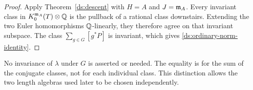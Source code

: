 \begin{proof}
Apply Theorem~\ref{ds:descent} with $H=A$ and $J=\mathfrak{m}_A$.
Every invariant class in $K_0^{\mathfrak{m}_A}(T)\otimes\mathbb{Q}$ is the
pullback of a rational class downstairs. Extending the two Euler
homomorphisms $\mathbb{Q}$-linearly, they therefore agree on that
invariant subspace. The class $\sum_{g\in G}[g^*P]$ is
invariant, which gives \eqref{ds:ordinary-norm-identity}.
\end{proof}

\begin{remark}
\label{ds:no-length-invariance}
No invariance of $\lambda$ under $G$ is asserted or needed.
The equality is for the sum of the conjugate classes, not for each
individual class. This distinction allows the two length algebras
used later to be chosen independently.
\end{remark}
